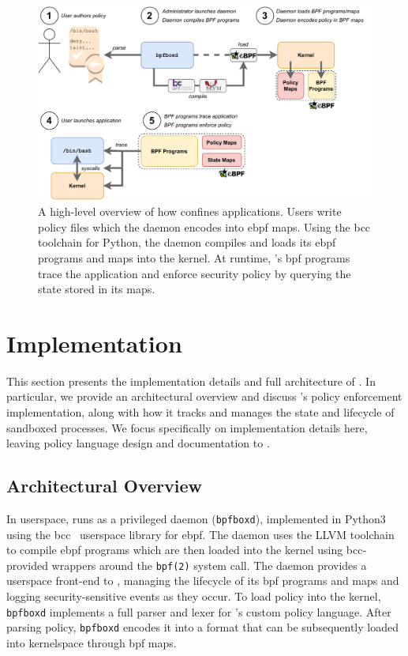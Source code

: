 \begin{figure}[htpb]
  \centering
  \includegraphics[width=1\linewidth]{figs/bpfbox/overview.pdf}
  \caption[A high-level overview of how \bpfbox{} confines applications]{
    A high-level overview of how \bpfbox{} confines applications. Users write policy files
    which the daemon encodes into \gls{ebpf} maps. Using the bcc toolchain for Python, the
    daemon compiles and loads its \gls{ebpf} programs and maps into the kernel. At
    runtime, \bpfbox{}'s \gls{bpf} programs trace the application and enforce security
    policy by querying the state stored in its maps.
  }%
  \label{fig:bpfbox-policy-overview}
\end{figure}



\section{\bpfbox{} Implementation}%
\label{s:bpfbox-implementation}

This section presents the implementation details and full architecture of \bpfbox{}.  In
particular, we provide an architectural overview and discuss \bpfbox{}'s policy
enforcement implementation, along with how it tracks and manages the state and lifecycle
of sandboxed processes. We focus specifically on implementation details here, leaving
policy language design and documentation to .

\subsection{Architectural Overview}%
\label{ss:bpfbox-architecture}

In userspace, \bpfbox{} runs as a privileged daemon (\texttt{bpfboxd}), implemented in
Python3 using the bcc~\cite{bcc} userspace library for \gls{ebpf}. The daemon uses the
LLVM toolchain~\cite{llvm_bpf} to compile \gls{ebpf} programs which are then loaded into
the kernel using bcc-provided wrappers around the \texttt{bpf(2)} system call. The daemon
provides a userspace front-end to \bpfbox{}, managing the lifecycle of its \gls{bpf}
programs and maps and logging security-sensitive events as they occur. To load policy into
the kernel, \texttt{bpfboxd} implements a full parser and lexer for \bpfbox{}'s custom
policy language.  After parsing policy, \texttt{bpfboxd} encodes it into a format that can
be subsequently loaded into kernelspace through \gls{bpf} maps.

